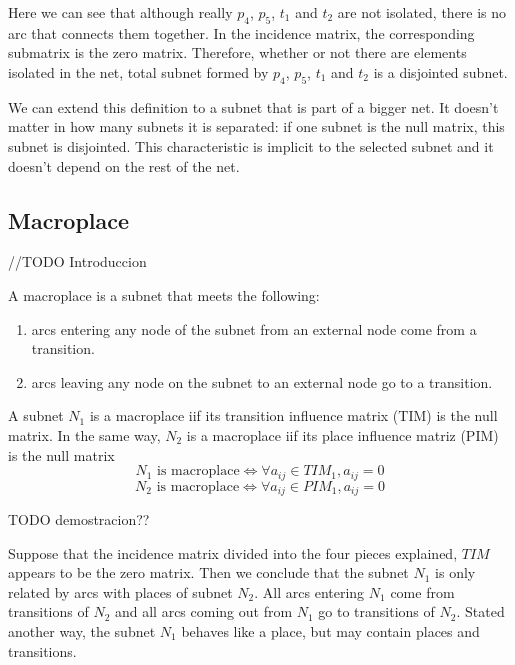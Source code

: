{\begin{example}
Here we can see that although really $p_4 $, $ p_5 $, $ t_1 $ and $ t_2 $ are not isolated, there is no arc that connects them together. In the incidence matrix, the corresponding submatrix is the zero matrix. Therefore, whether or not there are elements isolated in the net, total subnet formed by $ p_4 $, $ p_5 $, $ t_1 $ and $t_2$ is a disjointed subnet.

\end{example}

We can extend this definition to a subnet that is part of a bigger net. It
doesn't matter in how many subnets it is separated: if one subnet is the null
matrix, this subnet is disjointed. This characteristic is implicit to the selected subnet and it doesn't depend on the rest of the net.

\subsection{Macroplace}

//TODO Introduccion
\begin{definition}[Macroplace]
A macroplace is a subnet that meets the following:
\begin{enumerate}
 \item arcs entering any node of the subnet from an external node come from a transition.
 \item arcs leaving any node on the subnet to an external node go to a transition.
\end{enumerate}
\end{definition}

\begin{proposition}
A subnet $N_1$ is a macroplace iif its transition influence matrix (TIM) is the null matrix. In the same way, $N_2$ is a macroplace iif its place
influence matriz (PIM) is the null matrix
\[
N_1\mbox{ is macroplace} \iff \forall a_{ij} \in TIM_1, a_{ij} =
0
\]
\[
N_2\mbox{ is macroplace} \iff \forall a_{ij} \in PIM_1, a_{ij} =
0
\]
\end{proposition}
TODO demostracion??

Suppose that the incidence matrix divided into the four pieces explained, $TIM$ appears to be the zero matrix. Then we conclude that the subnet $N_1$ is only related by arcs with places of subnet $N_2$. All arcs entering $N_1$ come from transitions of $N_2$ and all arcs coming out from $N_1$ go to transitions of $N_2$. Stated another way, the subnet $N_1$ behaves like a place, but may contain places and transitions.

}
